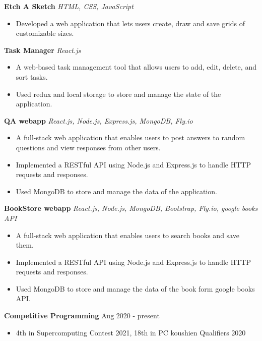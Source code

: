 \documentclass[a4paper,12pt]{article}
\begin{document}
\textbf{Etch A Sketch} 
\href{https://uliba3.github.io/Etch-A-Sketch/}{\faGlobe} 
\href{https://github.com/uliba3/Etch-A-Sketch}{\faGithub}
\textit{HTML, CSS, JavaScript}
\begin{itemize}
    \item Developed a web application that lets users create, draw and save grids of customizable sizes.
\end{itemize}
\textbf{Task Manager} 
\href{https://uliba3.github.io/TaskManager/}{\faGlobe}
\href{https://github.com/uliba3/TaskManager}{\faGithub}
\textit{React.js}
\begin{itemize}
    \item A web-based task management tool that allows users to add, edit, delete, and sort tasks.
    \item Used redux and local storage to store and manage the state of the application.
\end{itemize}
\textbf{QA webapp}
\href{https://white-voice-4708.fly.dev/}{\faGlobe}
\href{https://github.com/uliba3/Q-A-backend}{\faGithub}
\textit{React.js, Node.js, Express.js, MongoDB, Fly.io}
\begin{itemize}
    \item A full-stack web application that enables users to post answers to random questions and view responses from other users.
    \item Implemented a RESTful API using Node.js and Express.js to handle HTTP requests and responses.
    \item Used MongoDB to store and manage the data of the application.
\end{itemize}
\textbf{BookStore webapp}
\href{https://bookstore-backend.fly.dev/}{\faGlobe}
\href{https://github.com/uliba3/BookStore-backend}{\faGithub}
\textit{React.js, Node.js, MongoDB, Bootstrap, Fly.io, google books API}
\begin{itemize}
    \item A full-stack web application that enables users to search books and save them.
    \item Implemented a RESTful API using Node.js and Express.js to handle HTTP requests and responses.
    \item Used MongoDB to store and manage the data of the book form google books API.
\end{itemize}

\textbf{Competitive Programming} \hfill \textnormal{Aug 2020 - present}
\begin{itemize}
    \item 4th in Supercomputing Contest 2021, 18th in PC koushien Qualifiers 2020
\end{itemize}
\end{document}
